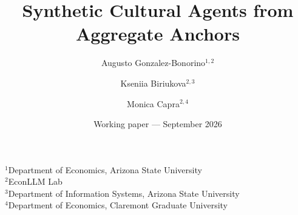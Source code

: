 \documentclass[11pt]{article}
\title{Synthetic Cultural Agents from Aggregate Anchors}
\author{Augusto Gonzalez-Bonorino$^{1,2}$ \and Kseniia Biriukova$^{2,3}$ \and Monica Capra$^{2,4}$}
\date{Working paper --- September 2026}
\begin{document}
\maketitle
\begin{center}\small
$^1$Department of Economics, Arizona State University\\
$^2$EconLLM Lab\\
$^3$Department of Information Systems, Arizona State University\\
$^4$Department of Economics, Claremont Graduate University
\end{center}








\clearpage


\clearpage

\end{document}
